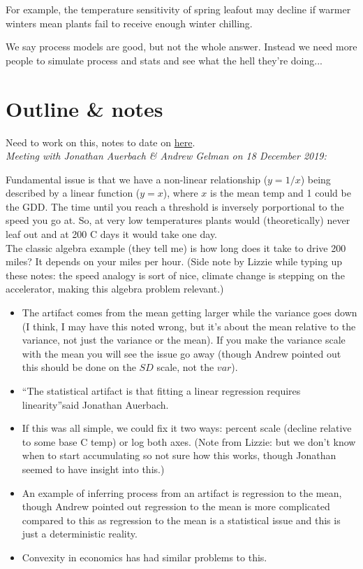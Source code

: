 \documentclass[11pt,letter]{article}
\begin{document}
For example, the temperature sensitivity of spring leafout may decline if warmer winters mean plants fail to receive enough winter chilling.  


We say process models are good, but not the whole answer. Instead we need more people to simulate process and stats and see what the hell they're doing... 
\section{Outline \& notes}

Need to work on this, notes to date on \href{https://github.com/lizzieinvancouver/ospree/wiki/Statistical-artifacts-in-sensitivities}{here}.\\

\emph{Meeting with Jonathan Auerbach \& Andrew Gelman on 18 December 2019:} 

Fundamental issue is that we have a non-linear relationship ($y=1/x$) being described by a linear function ($y=x$), where $x$ is the mean temp and 1 could be the GDD. The time until you reach a threshold is inversely porportional to the speed you go at. So, at very low temperatures plants would (theoretically) never leaf out and at 200 C days it would take one day. \\

The classic algebra example (they tell me) is how long does it take to drive 200 miles? It depends on your miles per hour. (Side note by Lizzie while typing up these notes: the speed analogy is sort of nice, climate change is stepping on the accelerator, making this algebra problem relevant.)

\begin{itemize}
\item The artifact comes from the mean getting larger while the variance goes down (I think, I may have this noted wrong, but it's about the mean relative to the variance, not just the variance or the mean). If you make the variance scale with the mean you will see the issue go away (though Andrew pointed out this should be done on the $SD$ scale, not the $var$).
\item ``The statistical artifact is that fitting a linear regression requires linearity''said  Jonathan Auerbach.
\item If this was all simple, we could fix it two ways: percent scale (decline relative to some base C temp) or log both axes. (Note from Lizzie: but we don't know when to start accumulating so not sure how this works, though Jonathan seemed to have insight into this.)
\item An example of inferring process from an artifact is regression to the mean, though Andrew pointed out regression to the mean is more complicated compared to this as regression to the mean is a statistical issue and this is just a deterministic reality. 
\item Convexity in economics has had similar problems to this. 
\end{itemize}
\end{document}
